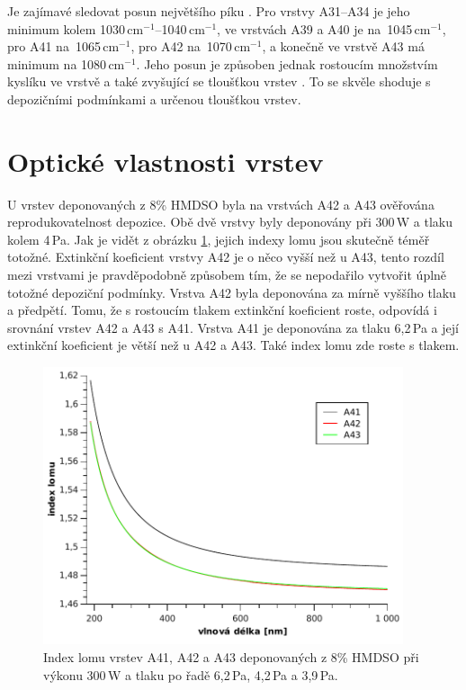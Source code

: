 \documentclass[12pt,oneside,final]{fithesis2}
\begin{document}
Je zajímavé sledovat posun největšího píku . Pro vrstvy A31--A34 je jeho minimum kolem 1030\,cm$^{-1}$--1040\,cm$^{-1}$, ve vrstvách A39 a A40 je na~1045\,cm$^{-1}$, pro A41 na~1065\,cm$^{-1}$, pro A42 na~1070\,cm$^{-1}$, a konečně ve vrstvě A43 má minimum na 1080\,cm$^{-1}$. Jeho posun je způsoben jednak rostoucím množstvím kyslíku ve vrstvě a také zvyšující se tloušťkou vrstev \cite{trunec2010}. To se skvěle shoduje s depozičními podmínkami a určenou tloušťkou vrstev.


\section{Optické vlastnosti vrstev}


U vrstev deponovaných z 8\% HMDSO byla na vrstvách A42 a A43 ověřována reprodukovatelnost depozice. Obě dvě vrstvy byly deponovány při 300\,W a tlaku kolem 4\,Pa. Jak je vidět z obrázku \ref{fig:A41nA43n}, jejich indexy lomu jsou skutečně téměř totožné. Extinkční koeficient vrstvy A42 je o něco vyšší než u A43, tento rozdíl mezi vrstvami je pravděpodobně způsobem tím, že se nepodařilo vytvořit úplně totožné depoziční podmínky. Vrstva A42 byla deponována za mírně vyššího tlaku a předpětí. Tomu, že s rostoucím tlakem extinkční koeficient roste, odpovídá i srovnání vrstev A42 a A43 s A41. Vrstva A41 je deponována za tlaku 6,2\,Pa a její extinkční koeficient je větší než u A42 a A43. Také index lomu zde roste s tlakem.

\begin{figure}[p]
  \centering
 \includegraphics[width=400px]{img/A41nA43n.pdf}
  \caption{Index lomu vrstev A41, A42 a A43 deponovaných z 8\% HMDSO při výkonu 300\,W a tlaku po řadě 6,2\,Pa, 4,2\,Pa a 3,9\,Pa.}
  \label{fig:A41nA43n}
\end{figure}
\end{document}
